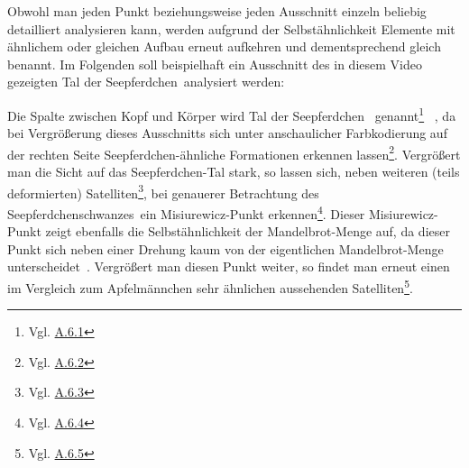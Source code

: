 Obwohl man jeden Punkt beziehungsweise jeden Ausschnitt einzeln beliebig detailliert
analysieren kann, werden aufgrund der Selbstähnlichkeit Elemente mit ähnlichem
oder gleichen Aufbau erneut aufkehren und dementsprechend gleich benannt.
Im Folgenden soll beispielhaft ein Ausschnitt des in diesem
Video~\cite{beyer_zoomfahrt_2017} gezeigten
\glqq Tal der Seepferdchen\grqq~analysiert werden:

Die Spalte zwischen Kopf und K\"orper wird \glqq Tal der Seepferdchen\grqq
~genannt\footnote{Vgl. \hyperref[app:6.1]{A.6.1}}
~\cite{robert_p_seahorse_2010}, da bei Vergrößerung dieses Ausschnitts
sich unter anschaulicher Farbkodierung auf der rechten Seite
Seepferdchen-ähnliche Formationen erkennen lassen\footnote{Vgl. \hyperref[app:6.2]{A.6.2}}.
Vergrößert man die Sicht auf das Seepferdchen-Tal stark, so lassen sich,
neben weiteren (teils deformierten) Satelliten\footnote{Vgl. \hyperref[app:6.3]{A.6.3}},
bei genauerer Betrachtung des \glqq Seepferdchenschwanzes\grqq~ein
Misiurewicz-Punkt erkennen\footnote{Vgl. \hyperref[app:6.4]{A.6.4}}.
Dieser Misiurewicz-Punkt zeigt ebenfalls die Selbstähnlichkeit der Mandelbrot-Menge auf,
da dieser Punkt sich neben einer Drehung kaum von der eigentlichen
Mandelbrot-Menge unterscheidet~\cite{lei_similarity_1989}.
Vergrößert man diesen Punkt weiter, so findet man erneut einen im Vergleich
zum Apfelm\"annchen sehr ähnlichen aussehenden
Satelliten\footnote{Vgl. \hyperref[app:6.5]{A.6.5}}.